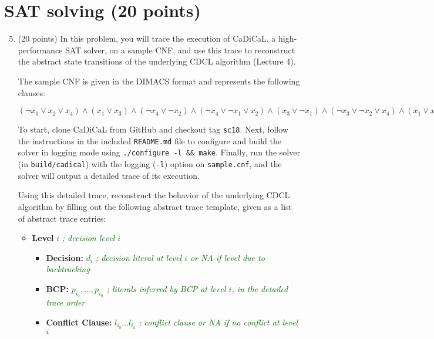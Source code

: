 \documentclass{article}
\begin{document}
\section{SAT solving (20 points)}\label{solving}


\begin{enumerate}
	\setcounter{enumi}{4}

	\item (20 points) In this problem, you will trace the execution of CaDiCaL, a high-performance SAT solver, on a sample CNF, and use this trace to reconstruct the abstract state transitions of the underlying CDCL algorithm (Lecture 4).

	The sample CNF is given in the DIMACS format and represents the following clauses:
	\begin{center}
		$(\neg x_1 \lor x_2 \lor x_4) \wedge (x_1 \lor x_3)  \wedge (\neg x_4 \lor \neg x_2) \wedge (\neg x_4 \lor \neg x_1 \lor x_2)  \wedge (x_3 \lor \neg x_1)  \wedge (\neg x_3 \lor \neg x_2 \lor x_4) \wedge (x_1 \lor x_4) \wedge (\neg x_2 \lor x_1)$
	\end{center}

	To start, clone CaDiCaL from GitHub and checkout tag \texttt{sc18}. Next, follow the instructions in the included \texttt{README.md} file to configure and build the solver in logging mode using \texttt{./configure -l \&\& make}. Finally, run the solver (in \texttt{build/cadical}) with the logging (\texttt{-l}) option on \texttt{sample.cnf}, and the solver will output a detailed trace of its execution.

	Using this detailed trace, reconstruct the behavior of the underlying CDCL algorithm by filling out the following abstract trace template, given as a list of abstract trace entries:

	\begin{itemize}
		\item \textbf{Level} \textcolor{DarkGreen}{$i$}  \hfill{\textcolor{DarkGreen}{\emph{; decision level $i$}}}
		\begin{itemize}
			\item \textbf{Decision:} \textcolor{DarkGreen}{$d_i$}  \hfill{\textcolor{DarkGreen}{\emph{; decision literal at level $i$ or NA if level due to backtracking}}}
			\item \textbf{BCP:} \textcolor{DarkGreen}{$p_{i_0}, \ldots, p_{i_n}$} \hfill{\textcolor{DarkGreen}{\emph{; literals inferred by BCP at level $i$, in the detailed trace order}}}
			\item \textbf{Conflict Clause:}  \textcolor{DarkGreen}{$l_{i_0} \ldots l_{i_k}$} \hfill{\textcolor{DarkGreen}{\emph{; conflict clause or NA if no conflict at level $i$}}}


\end{itemize}
\end{itemize}
\end{enumerate}
\end{document}
